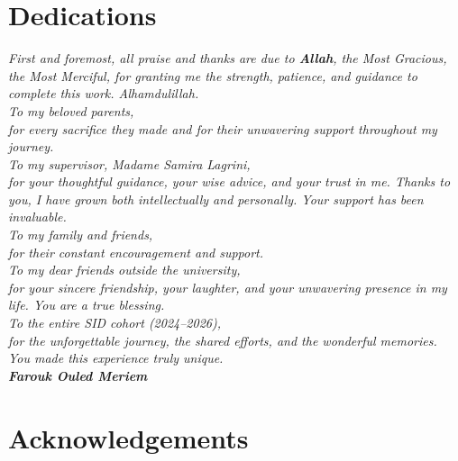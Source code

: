 \documentclass[12pt,a4paper]{report}
\begin{document}
\chapter*{Dedications}

\begin{center}
  \itshape\large
  First and foremost, all praise and thanks are due to \textbf{Allah}, the Most Gracious, the Most Merciful, for granting me the strength, patience, and guidance to complete this work. Alhamdulillah.\\[12pt]

  To my beloved parents,\\[6pt]
  for every sacrifice they made and for their unwavering support throughout my journey.\\[12pt]

  To my supervisor, Madame Samira Lagrini,\\[6pt]
  for your thoughtful guidance, your wise advice, and your trust in me. Thanks to you, I have grown both intellectually and personally. Your support has been invaluable.\\[12pt]

  To my family and friends,\\[6pt]
  for their constant encouragement and support.\\[12pt]

  To my dear friends outside the university,\\[6pt]
  for your sincere friendship, your laughter, and your unwavering presence in my life. You are a true blessing.\\[12pt]

  To the entire SID cohort (2024--2026),\\[6pt]
  for the unforgettable journey, the shared efforts, and the wonderful memories. You made this experience truly unique.\\[18pt]

  \upshape\normalsize\textbf{Farouk Ouled Meriem}
\end{center}


\newpage
\pagestyle{fancy}
\chapter*{Acknowledgements}
\end{document}
